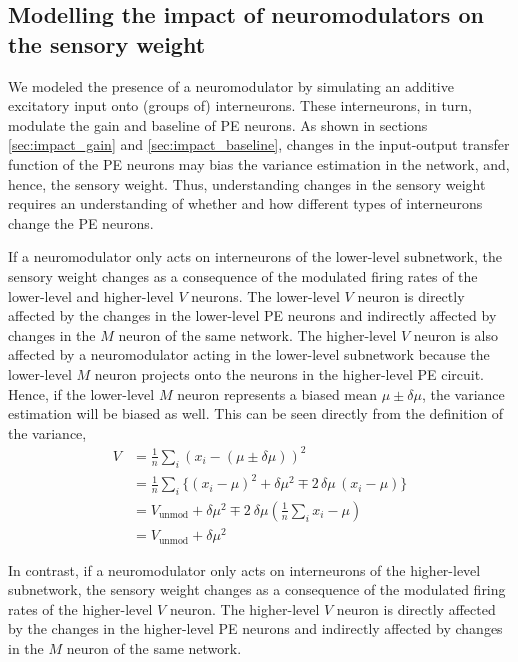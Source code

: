 \documentclass[10pt,a4paper,draft]{article}
\begin{document}
\subsection{Modelling the impact of neuromodulators on the sensory weight}
%
We modeled the presence of a neuromodulator by simulating an additive excitatory input onto (groups of) interneurons. These interneurons, in turn, modulate the gain and baseline of PE neurons. As shown in sections \ref{sec:impact_gain} and \ref{sec:impact_baseline}, changes in the input-output transfer function of the PE neurons may bias the variance estimation in the network, and, hence, the sensory weight. Thus, understanding changes in the sensory weight requires an understanding of whether and how different types of interneurons change the PE neurons.

If a neuromodulator only acts on interneurons of the lower-level subnetwork, the sensory weight changes as a consequence of the modulated firing rates of the lower-level and higher-level $V$ neurons. The lower-level $V$ neuron is directly affected by the changes in the lower-level PE neurons and indirectly affected by changes in the $M$ neuron of the same network. The higher-level $V$ neuron is also affected by a neuromodulator acting in the lower-level subnetwork because the lower-level $M$ neuron projects onto the neurons in the higher-level PE circuit. Hence, if the lower-level $M$ neuron represents a biased mean $\mu \pm \delta\mu$, the variance estimation will be biased as well. This can be seen directly from the definition of the variance,
%
\begin{align*}
V &= \frac{1}{n} \sum_i \left( x_i - \left(\mu \pm \delta\mu\right)\right)^2 \\
&= \frac{1}{n} \sum_i \lbrace  \left( x_i - \mu \right)^2 + \delta\mu^2 \mp 2\, \delta\mu\,  (x_i - \mu)\rbrace \\
&= V_\mathrm{unmod} + \delta\mu^2 \mp 2\ \delta\mu \left( \frac{1}{n} \sum_i x_i- \mu\right) \\
&= V_\mathrm{unmod} + \delta\mu^2
\end{align*}
%

In contrast, if a neuromodulator only acts on interneurons of the higher-level subnetwork, the sensory weight changes as a consequence of the modulated firing rates of the higher-level $V$ neuron. The higher-level $V$ neuron is directly affected by the changes in the higher-level PE neurons and indirectly affected by changes in the $M$ neuron of the same network.
\end{document}
